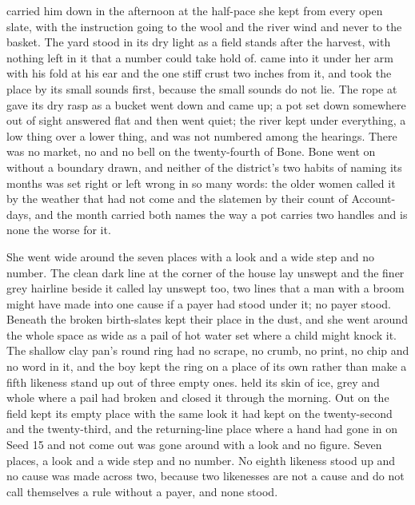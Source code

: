  carried him down in the afternoon at the half-pace she kept from every open slate, with the instruction going to the wool and the river wind and never to the basket. The yard stood in its dry light as a field stands after the harvest, with nothing left in it that a number could take hold of.  came into it under her arm with his fold at his ear and the one stiff crust two inches from it, and took the place by its small sounds first, because the small sounds do not lie. The rope at  gave its dry rasp as a bucket went down and came up; a pot set down somewhere out of sight answered flat and then went quiet; the river kept  under everything, a low thing over a lower thing, and was not numbered among the hearings. There was no market, no  and no bell on the twenty-fourth of Bone. Bone went on without a boundary drawn, and neither of the district's two habits of naming its months was set right or left wrong in so many words: the older women called it by the weather that had not come and the slatemen by their count of Account-days, and the month carried both names the way a pot carries two handles and is none the worse for it.

She went wide around the seven places with a look and a wide step and no number. The clean dark line at the corner of the house lay unswept and the finer grey hairline beside it called  lay unswept too, two lines that a man with a broom might have made into one cause if a payer had stood under it; no payer stood. Beneath  the broken birth-slates kept their place in the dust, and she went around the whole space as wide as a pail of hot water set where a child might knock it. The shallow clay pan's round ring had no scrape, no crumb, no print, no chip and no word in it, and the boy kept the ring on a place of its own rather than make a fifth likeness stand up out of three empty ones.  held its skin of ice, grey and whole where a pail had broken and closed it through the morning. Out on  the field kept its empty place with the same look it had kept on the twenty-second and the twenty-third, and the returning-line place where a hand had gone in on Seed 15 and not come out was gone around with a look and no figure. Seven places, a look and a wide step and no number. No eighth likeness stood up and no cause was made across two, because two likenesses are not a cause and do not call themselves a rule without a payer, and none stood.

